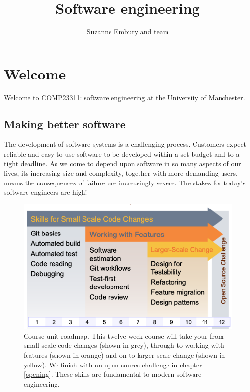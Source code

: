 \documentclass[
]{book}
\title{Software engineering}
\author{Suzanne Embury and team}
\date{}
\begin{document}
\maketitle

{
\setcounter{tocdepth}{1}
\tableofcontents
}
\hypertarget{welcome}{%
\chapter*{Welcome}\label{welcome}}

Welcome to COMP23311: \href{https://studentnet.cs.manchester.ac.uk/ugt/COMP23311/syllabus/}{software engineering at the University of Manchester}.

\hypertarget{better}{%
\section{Making better software}\label{better}}

The development of software systems is a challenging process. Customers expect reliable and easy to use software to be developed within a set budget and to a tight deadline. As we come to depend upon software in so many aspects of our lives, its increasing size and complexity, together with more demanding users, means the consequences of failure are increasingly severe. The stakes for today's software engineers are high!

\begin{figure}

{\centering \includegraphics[width=1\linewidth]{images/course-overview} 

}

\caption{Course unit roadmap. This twelve week course will take your from small scale code changes (shown in grey), through to working with features (shown in orange) and on to larger-scale change (shown in yellow). We finish with an open source challenge in chapter \ref{opening}. These skills are fundamental to modern software engineering.}\label{fig:course-overview-fig}
\end{figure}
\end{document}
